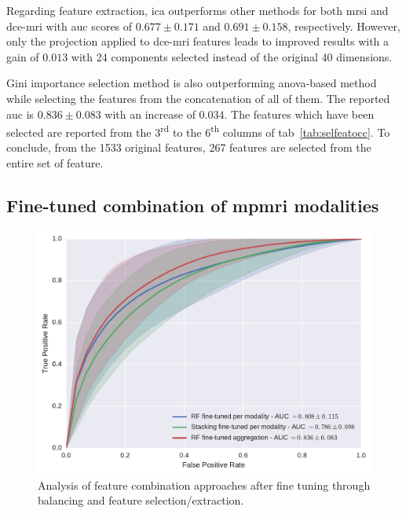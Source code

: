 Regarding feature extraction, \ac{ica} outperforms other methods for both \ac{mrsi} and \ac{dce}-\ac{mri} with \ac{auc} scores of $0.677 \pm 0.171$ and $0.691 \pm 0.158$, respectively.
However, only the projection applied to \ac{dce}-\ac{mri} features leads to improved results with a gain of $0.013$ with 24 components selected instead of the original 40 dimensions.

Gini importance selection method is also outperforming \ac{anova}-based method while selecting the features from the concatenation of all of them.
The reported \ac{auc} is $0.836 \pm 0.083$ with an increase of $0.034$.
The features which have been selected are reported from the 3\textsuperscript{rd} to the 6\textsuperscript{th} columns of \acs{tab}~\ref{tab:selfeatocc}.
To conclude, from the 1533 original features, 267 features are selected from the entire set of feature.

\subsection{Fine-tuned combination of \ac{mpmri} modalities}\label{subsec:chp6:exp-res:Ex4}

\begin{figure}
  \centering
  \includegraphics[width=0.7\linewidth]{content/figures/exp-5/combine_all.pdf}
  \caption[Analysis of feature combination approaches after fine tuning.]{Analysis of feature combination approaches after fine tuning through balancing and feature selection/extraction.}
  \label{fig:res-Ex4}
\end{figure}

